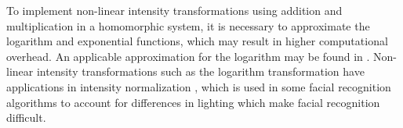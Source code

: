 To implement non-linear intensity transformations using addition and multiplication in a homomorphic system, it is necessary to approximate the logarithm and exponential functions, which may result in higher computational overhead. An applicable approximation for the logarithm may be found in \cite{pcsc-paper}. 
Non-linear intensity transformations such as the logarithm transformation have applications in intensity normalization \cite{oravec_illumination_2010}, which is used in some facial recognition algorithms to account for differences in lighting which make facial recognition difficult.